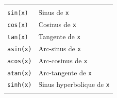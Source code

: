 \documentclass[
  11pt,
]{book}
\numberwithin{equation}{section}
\numberwithin{countremarque}{section}
\begin{document}
\begin{longtable}[]{@{}ll@{}}
\begin{minipage}[t]{0.53\columnwidth}
\end{minipage}\tabularnewline
\begin{minipage}[t]{0.41\columnwidth}\raggedright
\texttt{sin(x)}\strut
\end{minipage} & \begin{minipage}[t]{0.53\columnwidth}\raggedright
Sinus de \texttt{x}\strut
\end{minipage}\tabularnewline
\begin{minipage}[t]{0.41\columnwidth}\raggedright
\texttt{cos(x)}\strut
\end{minipage} & \begin{minipage}[t]{0.53\columnwidth}\raggedright
Cosinus de \texttt{x}\strut
\end{minipage}\tabularnewline
\begin{minipage}[t]{0.41\columnwidth}\raggedright
\texttt{tan(x)}\strut
\end{minipage} & \begin{minipage}[t]{0.53\columnwidth}\raggedright
Tangente de \texttt{x}\strut
\end{minipage}\tabularnewline
\begin{minipage}[t]{0.41\columnwidth}\raggedright
\texttt{asin(x)}\strut
\end{minipage} & \begin{minipage}[t]{0.53\columnwidth}\raggedright
Arc-sinus de \texttt{x}\strut
\end{minipage}\tabularnewline
\begin{minipage}[t]{0.41\columnwidth}\raggedright
\texttt{acos(x)}\strut
\end{minipage} & \begin{minipage}[t]{0.53\columnwidth}\raggedright
Arc-cosinus de \texttt{x}\strut
\end{minipage}\tabularnewline
\begin{minipage}[t]{0.41\columnwidth}\raggedright
\texttt{atan(x)}\strut
\end{minipage} & \begin{minipage}[t]{0.53\columnwidth}\raggedright
Arc-tangente de \texttt{x}\strut
\end{minipage}\tabularnewline
\begin{minipage}[t]{0.41\columnwidth}\raggedright
\texttt{sinh(x)}\strut
\end{minipage} & \begin{minipage}[t]{0.53\columnwidth}\raggedright
Sinus hyperbolique de \texttt{x}\strut
\end{minipage}\tabularnewline
\begin{minipage}[t]{0.41\columnwidth}\raggedright

\end{minipage}
\end{longtable}
\end{document}
